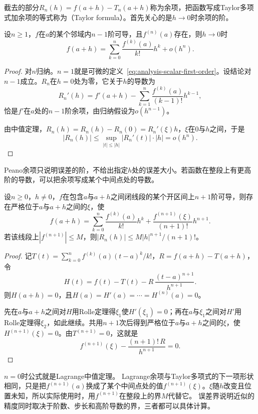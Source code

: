 截去的部分$R_n(h)=f(a+h)-T_n(a+h)$称为余项，把函数写成Taylor多项式加余项的等式称为（Taylor formula）。首先关心的是$h\to0$时余项的阶。
\begin{theorem}[带Peano余项的Taylor公式]
\label{thm:ru-taylor-peano}
设$n\geq1$，$f$在$a$的某个邻域内$n-1$阶可导，且$f^{(n)}(a)$存在，则$h\to0$时
\begin{equation}
 f(a+h)=\sum_{k=0}^n\frac{f^{(k)}(a)}{k!}h^k+o(h^n).
 \label{eq:ru-taylor-peano}
\end{equation}
\end{theorem}
\begin{proof}
对$n$归纳。$n=1$就是可微的定义~\eqref{eq:analysis-scalar-first-order}。设结论对$n-1$成立。$R_n$在$h=0$处为零，它关于$h$的导数为
\[
 R_n'(h)=f'(a+h)-\sum_{k=1}^n\frac{f^{(k)}(a)}{(k-1)!}h^{k-1},
\]
恰是$f'$在$a$处的$n-1$阶余项，由归纳假设为$o(h^{n-1})$。

由中值定理，$R_n(h)=R_n(h)-R_n(0)=R_n'(\xi)h$，$\xi$在$0$与$h$之间，于是
\[
 |R_n(h)|\leq\sup_{|t|\leq|h|}|R_n'(t)|\cdot|h|=o(h^n).
\]
\end{proof}
Peano余项只说明误差的阶，不给出指定$h$处的误差大小。若函数在整段上有更高阶的导数，可以把余项写成某个中间点处的导数。
\begin{theorem}[带Lagrange余项的Taylor公式]
\label{thm:analysis-taylor-lagrange}
设$n\geq0$，$h\neq0$，$f$在包含$a$与$a+h$之间闭线段的某个开区间上$n+1$阶可导，则存在严格位于$a$与$a+h$之间的$\xi$，使
\begin{equation}
 f(a+h)=\sum_{k=0}^n\frac{f^{(k)}(a)}{k!}h^k+\frac{f^{(n+1)}(\xi)}{(n+1)!}h^{n+1}.
 \label{eq:analysis-taylor-arbitrary-order}
\end{equation}
若该线段上$|f^{(n+1)}|\leq M$，则$|R_n(h)|\leq M|h|^{n+1}/(n+1)!$。
\end{theorem}
\begin{proof}
记$T(t)=\sum_{k=0}^nf^{(k)}(a)(t-a)^k/k!$，$R=f(a+h)-T(a+h)$，令
\[
 H(t)=f(t)-T(t)-R\,\frac{(t-a)^{n+1}}{h^{n+1}}.
\]
则$H(a+h)=0$，且$H(a)=H'(a)=\cdots=H^{(n)}(a)=0$。

先在$a$与$a+h$之间对$H$用Rolle定理得$\xi_1$使$H'(\xi_1)=0$；再在$a$与$\xi_1$之间对$H'$用Rolle定理得$\xi_2$，如此继续。共用$n+1$次后得到严格位于$a$与$a+h$之间的$\xi$，使$H^{(n+1)}(\xi)=0$。由$T^{(n+1)}=0$，这就是
\[
 f^{(n+1)}(\xi)-\frac{(n+1)!\,R}{h^{n+1}}=0.
\]
\end{proof}
$n=0$时公式就是Lagrange中值定理。
Lagrange余项与Taylor多项式的下一项形状相同，只是把$f^{(n+1)}(a)$换成了某个中间点处的值$f^{(n+1)}(\xi)$。$\xi$随$h$改变且位置未知，所以实际使用时，用$f^{(n+1)}$在整段上的界$M$代替它。
误差界说明近似的精度同时取决于阶数、步长和高阶导数的界，三者都可以具体计算。

